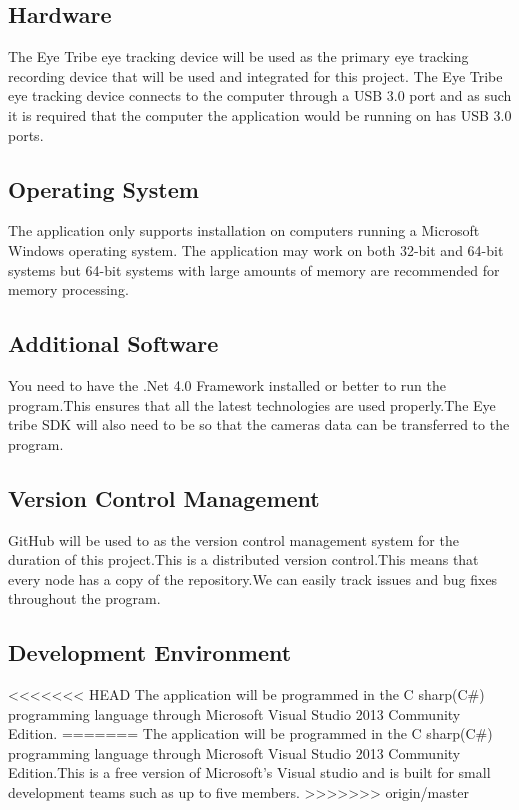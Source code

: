 \subsection{Hardware}
The Eye Tribe eye tracking device will be used as the primary eye tracking recording device that will be used  and integrated for this project. The Eye Tribe eye tracking device  connects to the computer through a USB 3.0 port and as such it is required that the computer the application would be running on has USB 3.0 ports. 
\subsection{Operating System}
The application only supports installation on computers running a Microsoft Windows operating system. The application may work on both 32-bit and 64-bit systems but 64-bit systems with large amounts of memory are recommended for memory processing. 
\subsection{Additional Software}
You need to have the .Net 4.0 Framework installed or better to run the program.This ensures that all the latest technologies are used properly.The Eye tribe SDK will also need to be so that the cameras data can be transferred to the program.
\subsection{Version Control Management}
GitHub will be used to as the version control management system for the duration of this project.This is a distributed version control.This means that every node has a copy of the repository.We can easily track issues and bug fixes throughout the program.
\subsection{Development Environment}
<<<<<<< HEAD
The application will be programmed in the C sharp(C\#) programming language through Microsoft Visual Studio 2013 Community Edition.
=======
The application will be programmed in the C sharp(C\#) programming language through Microsoft Visual Studio 2013 Community Edition.This is a free version of Microsoft's Visual studio and is built for small development teams such as up to five members.
>>>>>>> origin/master
